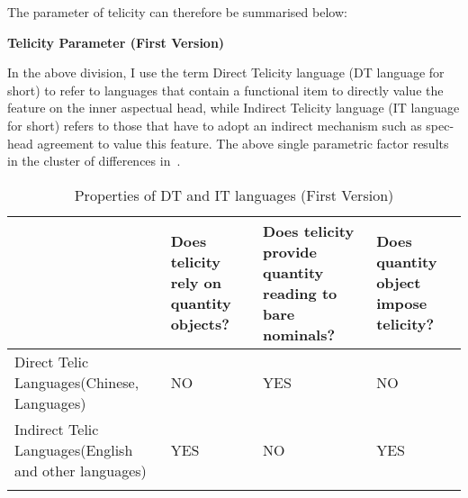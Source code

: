 \documentclass[output=paper]{langsci/langscibook}
\begin{document}
The parameter of telicity can therefore be summarised below:

\begin{exe}\ex \textbf{Telicity Parameter (First Version)}
\end{exe}
\begin{center}
\end{center}

In the above division, I use the term Direct Telicity language
(\gls{DT} language for short) to refer to languages that contain a
functional item to directly value the feature on the inner aspectual head,
while Indirect Telicity language (\gls{IT} language for short)
refers to those that have to adopt an indirect mechanism such as spec-head
agreement to value this feature. The above single parametric factor results in
the cluster of differences in~.

\begin{table}[htb]
\caption{Properties of DT and IT languages (First Version)}\label{table:1}
{\small
\begin{tabulary}{1\textwidth}{JJJJ}
\lsptoprule
{} & Does telicity rely on quantity objects? & Does telicity provide quantity reading to bare nominals? & Does quantity object impose telicity? \\
\midrule
Direct Telic Languages\newline (Chinese,  Languages)             & NO                                      & YES                                                      & NO \\
Indirect Telic Languages\newline (English and other  languages) & YES                                     & NO                                                       & YES\\
\lspbottomrule
\end{tabulary}
}
\end{table}
\end{document}
